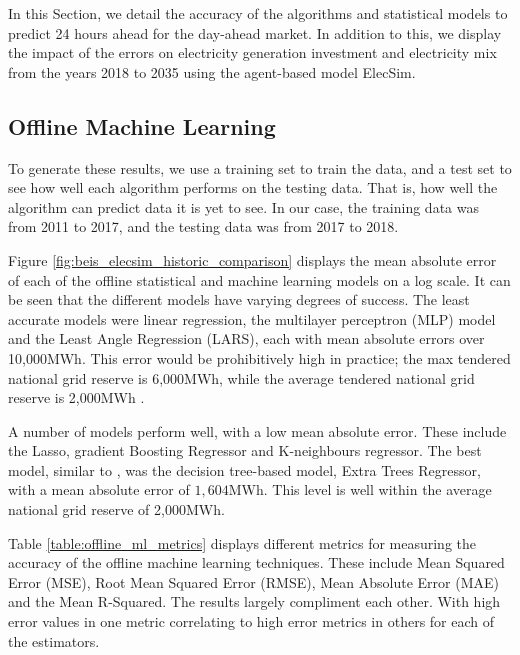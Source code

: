 \documentclass[final,3p,times,twocolumn,numbers]{elsarticle}
\begin{document}
In this Section, we detail the accuracy of the algorithms and statistical models to predict 24 hours ahead for the day-ahead market. In addition to this, we display the impact of the errors on electricity generation investment and electricity mix from the years 2018 to 2035 using the agent-based model ElecSim.



\subsection{Offline Machine Learning}

To generate these results, we use a training set to train the data, and a test set to see how well each algorithm performs on the testing data. That is, how well the algorithm can predict data it is yet to see. In our case, the training data was from 2011 to 2017, and the testing data was from 2017 to 2018.

Figure \ref{fig:beis_elecsim_historic_comparison} displays the mean absolute error of each of the offline statistical and machine learning models on a log scale. It can be seen that the different models have varying degrees of success. The least accurate models were linear regression, the multilayer perceptron (MLP) model and the Least Angle Regression (LARS), each with mean absolute errors over 10,000MWh. This error would be prohibitively high in practice; the max tendered national grid reserve is 6,000MWh, while the average tendered national grid reserve is 2,000MWh \cite{ESO2019}.



A number of models perform well, with a low mean absolute error. These include the Lasso, gradient Boosting Regressor and K-neighbours regressor. The best model, similar to \cite{Kell2018a}, was the decision tree-based model, Extra Trees Regressor, with a mean absolute error of $1,604$MWh. This level is well within the average national grid reserve of 2,000MWh.

Table \ref{table:offline_ml_metrics} displays different metrics for measuring the accuracy of the offline machine learning techniques. These include Mean Squared Error (MSE), Root Mean Squared Error (RMSE), Mean Absolute Error (MAE) and the Mean R-Squared. The results largely compliment each other. With high error values in one metric correlating to high error metrics in others for each of the estimators.
\end{document}
